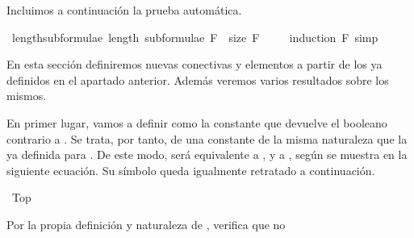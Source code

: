 \begin{isabellebody}
\begin{isamarkuptext}
  Incluimos a continuación la prueba automática.%
\end{isamarkuptext}\isamarkuptrue%
\isamarkupfalse%
\ length{\isacharunderscore}subformulae{\isacharcolon}\ {\isachardoublequoteopen}length\ {\isacharparenleft}subformulae\ F{\isacharparenright}\ {\isacharequal}\ size\ F{\isachardoublequoteclose}\ \isanewline
%
\isadelimproof
\ \ %
\endisadelimproof
%
\isatagproof
{}\isamarkupfalse%
\ {\isacharparenleft}induction\ F{\isacharsemicolon}\ simp{\isacharparenright}%
\endisatagproof
{\isafoldproof}%
%
\isadelimproof
%
\endisadelimproof
%
\begin{isamarkuptext}%
%
\end{isamarkuptext}\isamarkuptrue%
%
\isadelimdocument
%
\endisadelimdocument
%
\isatagdocument
%
\isamarkuptrue%
%
\endisatagdocument
{\isafolddocument}%
%
\isadelimdocument
%
\endisadelimdocument
%
\begin{isamarkuptext}%
En esta sección definiremos nuevas conectivas y elementos a partir 
  de los ya definidos en el apartado anterior. Además veremos varios 
  resultados sobre los mismos.%
\end{isamarkuptext}\isamarkuptrue%
%
\begin{isamarkuptext}%
En primer lugar, vamos a definir  como 
  la constante  que devuelve el booleano contrario a . Se trata, 
  por tanto, de una constante de la misma naturaleza que la ya definida 
  para . De este modo,  será equivalente a , y 
   a , según se muestra en la siguiente ecuación. Su símbolo 
  queda igualmente retratado a continuación.%
\end{isamarkuptext}\isamarkuptrue%
\isamarkupfalse%
\ Top\ {\isacharparenleft}{\isachardoublequoteopen}{\isasymtop}{\isachardoublequoteclose}{\isacharparenright}\ \isanewline
\ \ {\isachardoublequoteopen}{\isasymtop}\ {\isasymequiv}\ {\isasymbottom}\ \isactrlbold {\isasymrightarrow}\ {\isasymbottom}{\isachardoublequoteclose}%
\begin{isamarkuptext}%
%
\end{isamarkuptext}\isamarkuptrue%
%
\begin{isamarkuptext}%
Por la propia definición y naturaleza de , verifica que no 

\end{isamarkuptext}
\end{isabellebody}

